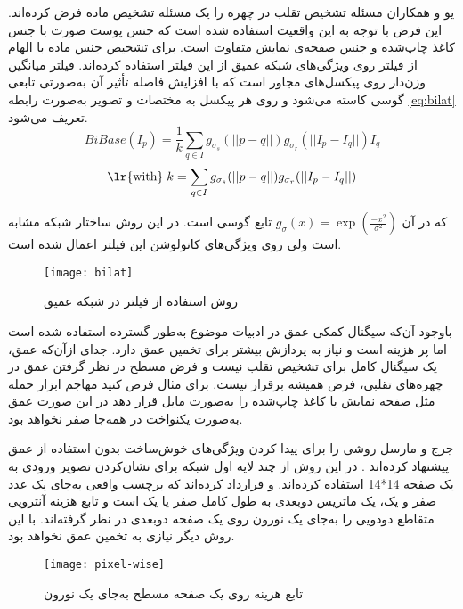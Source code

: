  یو و همکاران 
\cite{yu2020face}
 مسئله تشخیص تقلب در چهره را یک مسئله تشخیص ماده فرض کرده‌اند. این فرض با توجه به این واقعیت استفاده شده است که جنس پوست صورت با جنس کاغذ چاپ‌شده و جنس صفحه‌ی نمایش متفاوت است. برای تشخیص جنس ماده با الهام از فیلتر  روی ویژگی‌های شبکه عمیق از این فیلتر استفاده کرده‌اند. فیلتر  میانگین وزن‌دار روی پیکسل‌های مجاور است که با افزایش فاصله تأثیر آن به‌صورتی تابعی گوسی کاسته می‌شود و روی هر پیکسل به مختصات  و تصویر  به‌صورت رابطه 
\ref{eq:bilat}  
 تعریف می‌شود.
\begin{equation}\label{eq:bilat}
	BiBase(I_p)=\frac{1}{k}\sum_{q\in I}{g_{\sigma_s}(||p-q||)g_{\sigma_r}(||I_p-I_q||)I_q}
\end{equation}
\begin{equation}\label{eq:bilatk}
	\text{\lr{with}} \; k=\sum_{q\in I}{g_{\sigma_s}(||p-q||)g_{\sigma_r}(||I_p-I_q||)}
	\nonumber
\end{equation}

که در آن
$g_\sigma (x) = \exp(\frac{-x^2}{\sigma^2})$
تابع گوسی است. در این روش ساختار شبکه مشابه
\cite{liu2018learning}
 است ولی روی ویژگی‌های کانولوشن این فیلتر اعمال شده است.
 
\begin{figure}[t]
 	\centerline{\texttt{[image: bilat]}}
 	\caption{روش استفاده از فیلتر  در شبکه عمیق \cite{yu2020face} }
 	\label{fig:bilat}
\end{figure}

با‌وجود آن‌که سیگنال کمکی عمق در ادبیات موضوع به‌طور گسترده استفاده شده است اما پر هزینه است و نیاز به پردازش بیشتر برای تخمین عمق دارد. جدای از‌آن‌که عمق، یک سیگنال کامل برای تشخیص تقلب نیست و فرض مسطح در نظر گرفتن عمق در چهره‌های تقلبی، فرض همیشه برقرار نیست. برای مثال فرض کنید مهاجم ابزار حمله مثل صفحه نمایش یا کاغذ چاپ‌شده را به‌صورت مایل قرار دهد در این صورت عمق به‌صورت یکنواخت در همه‌جا صفر نخواهد بود.

 جرج و مارسل روشی را برای پیدا کردن ویژگی‌های خوش‌ساخت بدون استفاده از عمق پیشنهاد کرده‌اند
 \cite{george2019deep}.
 در این روش از چند لایه اول شبکه 
\cite{huang2017densely}
برای نشان‌کردن
 تصویر ورودی به یک صفحه 14*14 استفاده کرده‌اند. و قرارداد کرده‌اند که برچسب واقعی به‌جای یک عدد صفر و یک، یک ماتریس دو‌بعدی به طول کامل صفر یا یک است و تابع هزینه آنتروپی متقاطع دودویی را به‌جای یک نورون روی یک صفحه دو‌بعدی در نظر گرفته‌اند. با این روش دیگر نیازی به تخمین عمق نخواهد بود.
\begin{figure}[h]
	\centerline{\texttt{[image: pixel-wise]}}
	\caption{تابع هزینه  روی یک صفحه مسطح به‌جای یک نورون \cite{george2019deep} }
	\label{fig:pixel-wise}
\end{figure}
